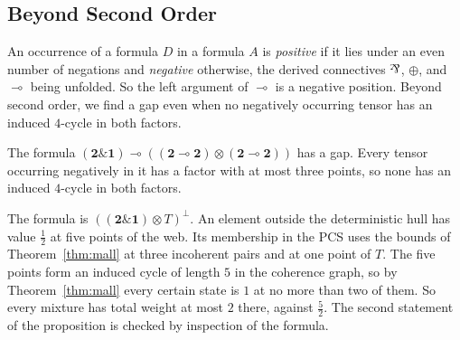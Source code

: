 \subsection{Beyond Second Order}
\label{sec:exact-beyond}

An occurrence of a formula $D$ in a formula $A$ is \emph{positive} if it
lies under an even number of negations and \emph{negative} otherwise, the
derived connectives $\parr$, $\oplus$, and $\multimap$ being unfolded. So
the left argument of $\multimap$ is a negative position. Beyond second
order, we find a gap even when no negatively occurring tensor has an
induced $4$-cycle in both factors.

\begin{proposition}
\label{prop:f3}
The formula $(\mathbf{2} \mathbin{\&} \mathbf{1}) \multimap
((\mathbf{2} \multimap \mathbf{2}) \otimes (\mathbf{2} \multimap
\mathbf{2}))$ has a gap. Every tensor occurring negatively in it has a
factor with at most three points, so none has an induced $4$-cycle in
both factors.
\end{proposition}

\noindent
The formula is $((\mathbf{2} \mathbin{\&} \mathbf{1}) \otimes T)^{\perp}$.
An element outside the deterministic hull has value $\tfrac12$ at five points of the
web. Its membership in the PCS uses the bounds of Theorem~\ref{thm:mall} at three incoherent pairs and
at one point of $T$. The five points form an induced cycle of length $5$ in the
coherence graph, so by Theorem~\ref{thm:mall} every certain state is $1$
at no more than two of them. So every mixture has total weight at most $2$
there, against $\tfrac52$. The second statement of the proposition is
checked by inspection of the formula.
